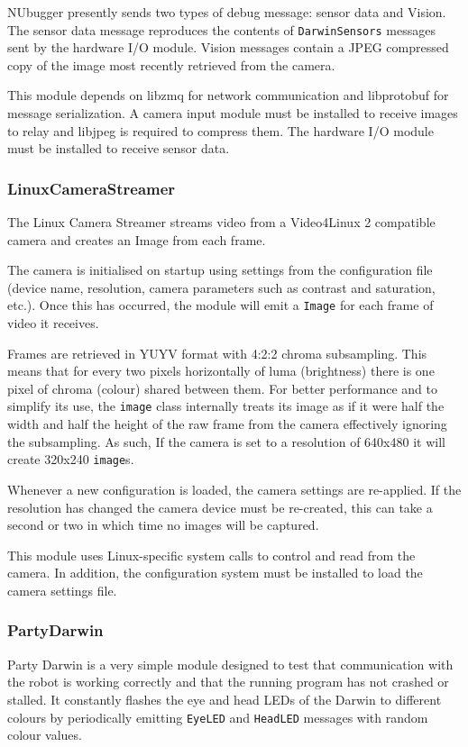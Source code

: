 \documentclass[english,12pt]{scrartcl}
\begin{document}
				NUbugger presently sends two types of debug message: sensor data and Vision.
				The sensor data message reproduces the contents of \texttt{DarwinSensors}
				messages sent by the hardware I/O module. Vision messages contain a JPEG
				compressed copy of the image most recently retrieved from the camera.

				This module depends on libzmq for network communication and libprotobuf for
				message serialization. A camera input module must be installed to receive
				images to relay and libjpeg is required to compress them. The hardware I/O
				module must be installed to receive sensor data.


			\subsubsection{LinuxCameraStreamer}
				The Linux Camera Streamer streams video from a Video4Linux 2 compatible camera and
				creates an Image from each frame.

				The camera is initialised on startup using settings from the configuration
				file (device name, resolution, camera parameters such as contrast and
				saturation, etc.). Once this has occurred, the module will emit a
				\texttt{Image} for each frame of video it receives.

				Frames are retrieved in YUYV format with 4:2:2 chroma subsampling. This means
				that for every two pixels horizontally of luma (brightness) there is one pixel
				of chroma (colour) shared between them. For better performance and to simplify
				its use, the \texttt{image} class internally treats its image as if it were half
				the width and half the height of the raw frame from the camera effectively
				ignoring the subsampling. As such, If the camera is set to a resolution of
				640x480 it will create 320x240 \texttt{image}s.

				Whenever a new configuration is loaded, the camera settings are re-applied. If
				the resolution has changed the camera device must be re-created, this can take
				a second or two in which time no images will be captured.

				This module uses Linux-specific system calls to control and read from the camera.
				In addition, the configuration system must be installed to load the camera settings file.


			\subsubsection{PartyDarwin}
				Party Darwin is a very simple module designed to test that communication with the
				robot is working correctly and that the running program has not crashed or
				stalled. It constantly flashes the eye and head LEDs of the Darwin to different
				colours by periodically emitting \texttt{EyeLED} and \texttt{HeadLED} messages
				with random colour values.
\end{document}
